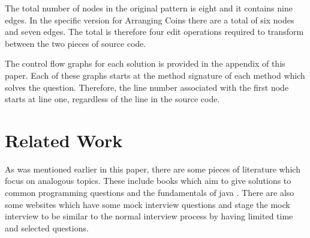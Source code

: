 \documentclass[10pt,twocolumn]{IEEEtran}
\begin{document}
\par The total number of nodes in the original pattern is eight and it contains nine edges. In the specific version for Arranging Coins there are a total of six nodes and seven edges. The total is therefore four edit operations required to transform between the two pieces of source code. 
\par The control flow graphs for each solution is provided in the appendix of this paper. Each of these graphs starts at the method signature of each method which solves the question. Therefore, the line number associated with the first node starts at line one, regardless of the line in the source code.
\section{Related Work}
As was mentioned earlier in this paper, there are some pieces of literature which focus on analogous topics. These include books which aim to give solutions to common programming questions \cite{mcdowell2015cracking} and the fundamentals of java \cite{markham2014java}\cite{aziz2012elements}. There are also some websites which have some mock interview questions and stage the mock interview to be similar to the normal interview process by having limited time and selected questions.
\end{document}
